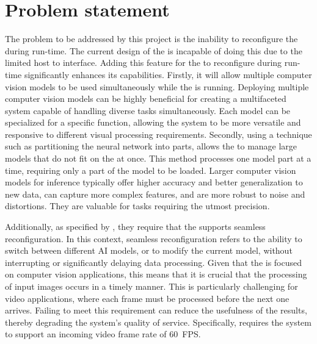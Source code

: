 \section{Problem statement}

The problem to be addressed by this project is the inability to reconfigure the \graicore{} during run-time.
The current design of the \graicore{} is incapable of doing this due to the limited host to \graicore{} interface.
Adding this feature for the \graicore{} to reconfigure during run-time significantly enhances its capabilities.
Firstly, it will allow multiple computer vision models to be used simultaneously while the \graicore{} is running.
Deploying multiple computer vision models can be highly beneficial for creating a multifaceted system capable of handling diverse tasks simultaneously.
Each model can be specialized for a specific function, allowing the system to be more versatile and responsive to different visual processing requirements.
Secondly, using a technique such as partitioning the neural network into parts, allows the \graicore{} to manage large models that do not fit on the \graicore{} at once.
This method processes one model part at a time, requiring only a part of the model to be loaded.
Larger computer vision models for inference typically offer higher accuracy and better generalization to new data, can capture more complex features, and are more robust to noise and distortions.
They are valuable for tasks requiring the utmost precision.

Additionally, as specified by \snap{}, they require that the \graicore{} supports seamless reconfiguration.
In this context, seamless reconfiguration refers to the ability to switch between different AI models, or to modify the current model, without interrupting or significantly delaying data processing.
Given that the \graicore{} is focused on computer vision applications, this means that it is crucial that the processing of input images occurs in a timely manner.
This is particularly challenging for video applications, where each frame must be processed before the next one arrives. Failing to meet this requirement can reduce the usefulness of the results, thereby degrading the system's quality of service.
Specifically, \snap{} requires the system to support an incoming video frame rate of \SI{60}{FPS}.
